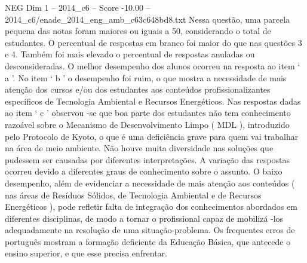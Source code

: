 \begin{textsample}{NEG Dim 1 – 2014\_c6 – Score -10.00 – 2014\_c6/enade\_2014\_eng\_amb\_c63c648bd8.txt}
Nessa questão, uma parcela pequena das notas foram maiores ou iguais a 50, considerando o total de estudantes.
O percentual de respostas em branco foi maior do que nas questões 3 e 4.
Também foi mais elevado o percentual de respostas anuladas ou desconsideradas.
O melhor desempenho dos alunos ocorreu na resposta ao item ‘ a ’.
No item ‘ b ’ o desempenho foi ruim, o que mostra a necessidade de mais atenção dos cursos e/ou dos estudantes aos conteúdos profissionalizantes específicos de Tecnologia Ambiental e Recursos Energéticos.
Nas respostas dadas ao item ‘ c ’ observou -se que boa parte dos estudantes não tem conhecimento razoável sobre o Mecanismo de Desenvolvimento Limpo ( MDL ), introduzido pelo Protocolo de Kyoto, o que é uma deficiência grave para quem vai trabalhar na área de meio ambiente.
Não houve muita diversidade nas soluções que pudessem ser causadas por diferentes interpretações.
A variação das respostas ocorreu devido a diferentes graus de conhecimento sobre o assunto.
O baixo desempenho, além de evidenciar a necessidade de mais atenção aos conteúdos ( nas áreas de Resíduos Sólidos, de Tecnologia Ambiental e de Recursos Energéticos ), pode refletir falta de integração dos conhecimentos abordados em diferentes disciplinas, de modo a tornar o profissional capaz de mobilizá -los adequadamente na resolução de uma situação-problema.
Os frequentes erros de português mostram a formação deficiente da Educação Básica, que antecede o ensino superior, e que esse precisa enfrentar.

\end{textsample}
